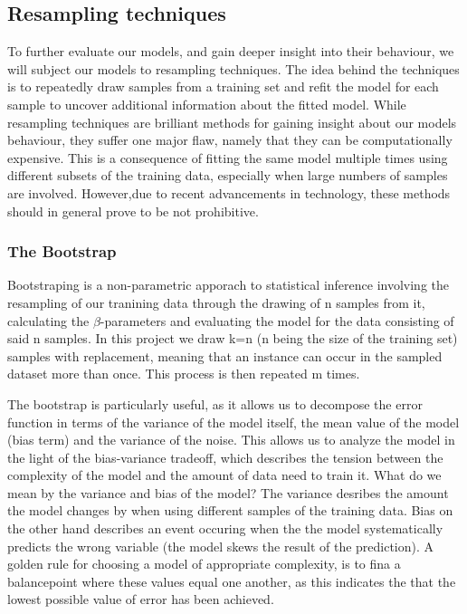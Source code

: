 \documentclass[a4paper, 10pt]{article}
\begin{document}
\subsection{Resampling techniques}
To further evaluate our models, and gain deeper insight into their behaviour, we will subject our models to resampling techniques. The idea behind the techniques is to repeatedly draw samples from a training set and refit the model for each sample to uncover additional information about the fitted model. While resampling techniques are brilliant methods for gaining insight about our models behaviour, they suffer one major flaw, namely that they can be computationally expensive. This is a consequence of fitting the same model multiple times using different subsets of the training data, especially when large numbers of samples are involved. However,due to recent advancements in technology, these methods should in general prove to be not prohibitive. 

\subsubsection{The Bootstrap}
Bootstraping is a non-parametric apporach to statistical inference involving the resampling of our tranining data through the drawing of n samples from it, calculating the $\beta$-parameters and evaluating the model for the data consisting of said n samples. In this project we draw k=n (n being the size of the training set) samples with replacement, meaning that an instance can occur in the sampled dataset more than once. This process is then repeated m times.

The bootstrap is particularly useful, as it allows us to decompose the error function in terms of the variance of the model itself, the mean value of the model (bias term) and the variance of the noise. This allows us to analyze the model in the light of the bias-variance tradeoff, which describes the tension between the complexity of the model and the amount of data need to train it. What do we mean by the variance and bias of the model? The variance desribes the amount the model changes by when using different samples of the training data. Bias on the other hand describes an event occuring when the the model systematically predicts the wrong variable (the model skews the result of the prediction). A golden rule for choosing a model of appropriate complexity, is to fina a balancepoint where these values equal one another, as this indicates the that the lowest possible value of error has been achieved. 
\end{document}
